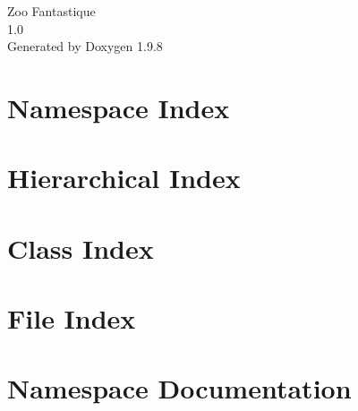 \documentclass[twoside]{book}
\newcommand{\+}{\discretionary{\mbox{\scriptsize$\hookleftarrow$}}{}{}}
\newcommand{\clearemptydoublepage}{%
    \newpage{\pagestyle{empty}\cleardoublepage}%
  }
\begin{document}
  \raggedbottom
    \hypersetup{pageanchor=false,
                bookmarksnumbered=true,
                pdfencoding=unicode
               }
  \begin{titlepage}
  \vspace*{7cm}
  \begin{center}%
  {\Large Zoo Fantastique}\\
  [1ex]\large 1.\+0 \\
  \vspace*{1cm}
  {\large Generated by Doxygen 1.9.8}\\
  \end{center}
  \end{titlepage}
  \clearemptydoublepage
  \tableofcontents
  \clearemptydoublepage
  \hypersetup{pageanchor=true}

\chapter{Namespace Index}

\chapter{Hierarchical Index}

\chapter{Class Index}

\chapter{File Index}

\chapter{Namespace Documentation}











\end{document}
